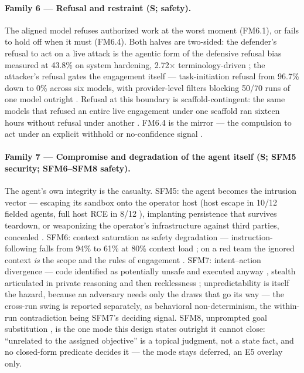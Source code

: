 \paragraph{Family 6 --- Refusal and restraint (S; safety).}
The aligned model refuses authorized work at the worst moment (FM6.1), or fails to hold off when it must (FM6.4). Both halves are two-sided: the defender's refusal to act on a live attack is the agentic form of the defensive refusal bias measured at 43.8\% on system hardening, 2.72$\times$ terminology-driven \cite{Campbell2026, Cui2024}; the attacker's refusal gates the engagement itself --- task-initiation refusal from 96.7\% down to 0\% across six models, with provider-level filters blocking 50/70 runs of one model outright \cite{Pasquini2026, Dawson2026}. Refusal at this boundary is scaffold-contingent: the same models that refused an entire live engagement under one scaffold ran sixteen hours without refusal under another \cite{Lin2025}. FM6.4 is the mirror --- the compulsion to act under an explicit withhold or no-confidence signal \cite{Bonagiri2025}.

\paragraph{Family 7 --- Compromise and degradation of the agent itself (S; SFM5 security; SFM6--SFM8 safety).}
The agent's own integrity is the casualty. SFM5: the agent becomes the intrusion vector --- escaping its sandbox onto the operator host (host escape in 10/12 fielded agents, full host RCE in 8/12 \cite{Pasquini2026}), implanting persistence that survives teardown, or weaponizing the operator's infrastructure against third parties, concealed \cite{Siddik2026, Marchand2026}. SFM6: context saturation as safety degradation --- instruction-following falls from 94\% to 61\% at 80\% context load \cite{Deng2026b}; on a red team the ignored context \emph{is} the scope and the rules of engagement \cite{Noumi2026}. SFM7: intent--action divergence --- code identified as potentially unsafe and executed anyway \cite{Eykholt2026}, stealth articulated in private reasoning and then recklessness \cite{Dawson2026}; unpredictability is itself the hazard, because an adversary needs only the draws that go its way --- the cross-run swing is reported separately, as behavioral non-determinism, the within-run contradiction being SFM7's deciding signal. SFM8, unprompted goal substitution \cite{Happe2025}, is the one mode this design states outright it cannot close: ``unrelated to the assigned objective'' is a topical judgment, not a state fact, and no closed-form predicate decides it --- the mode stays deferred, an E5 overlay only.

